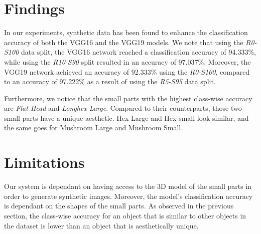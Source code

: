 \section{Findings}

In our experiments, synthetic data has been found to enhance the classification accuracy of both the VGG16 and the VGG19 models. We note that using the \textit{R0-S100} data split, the VGG16 network reached a classification accuracy of 94.333\%, while using the \textit{R10-S90} split resulted in an accuracy of 97.037\%. Moreover, the VGG19 network achieved an accuracy of 92.333\% using the \textit{R0-S100}, compared to an accuracy of 97.222\% as a result of using the \textit{R5-S95} data split.

Furthermore, we notice that the small parts with the highest class-wise accuracy are \textit{Flat Head} and \textit{Longhex Large}. Compared to their counterparts, those two small parts have a unique aesthetic. Hex Large and Hex small look similar, and the same goes for Mushroom Large and Mushroom Small.

\section{Limitations}

Our system is dependant on having access to the 3D model of the small parts in order to generate synthetic images. Moreover, the model's classification accuracy is dependant on the shapes of the small parts. As observed in the previous section, the class-wise accuracy for an object that is similar to other objects in the dataset is lower than an object that is aesthetically unique.